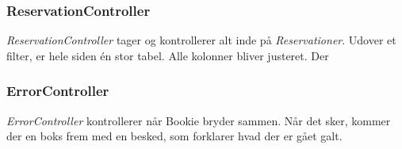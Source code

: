 \subsubsection{ReservationController}

\textit{ReservationController} tager og kontrollerer alt inde på \textit{Reservationer}. Udover et filter, er hele siden én stor tabel. Alle kolonner bliver justeret. Der 

\subsubsection{ErrorController}

\textit{ErrorController} kontrollerer når Bookie bryder sammen. Når det sker, kommer der en boks frem med en besked, som forklarer hvad der er gået 
galt.
